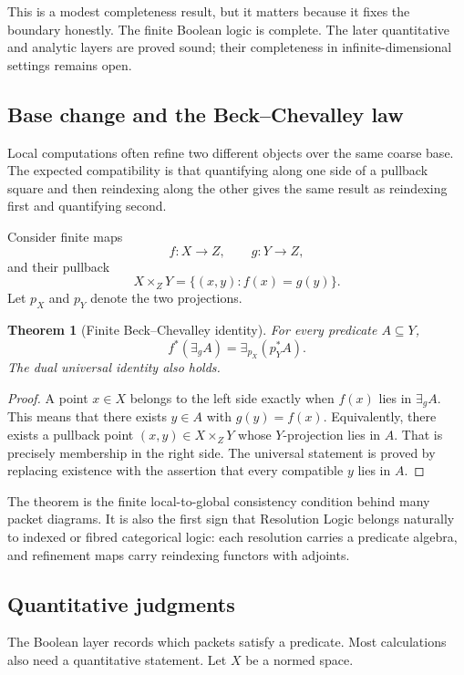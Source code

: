 \documentclass[11pt]{article}
\newtheorem{theorem}{Theorem}[section]
\theoremstyle{definition}
\theoremstyle{remark}
\begin{document}
This is a modest completeness result, but it matters because it fixes the boundary honestly.  The finite Boolean logic is complete.  The later quantitative and analytic layers are proved sound; their completeness in infinite-dimensional settings remains open.

\subsection{Base change and the Beck--Chevalley law}

Local computations often refine two different objects over the same coarse base.  The expected compatibility is that quantifying along one side of a pullback square and then reindexing along the other gives the same result as reindexing first and quantifying second.

Consider finite maps
\[
   f:X\to Z,
   \qquad
   g:Y\to Z,
\]
and their pullback
\[
   X\times_ZY
   =\{(x,y):f(x)=g(y)\}.
\]
Let $p_X$ and $p_Y$ denote the two projections.

\begin{theorem}[Finite Beck--Chevalley identity]
For every predicate $A\subseteq Y$,
\[
   f^*(\exists_g A)
   =
   \exists_{p_X}(p_Y^*A).
\]
The dual universal identity also holds.
\end{theorem}

\begin{proof}
A point $x\in X$ belongs to the left side exactly when $f(x)$ lies in $\exists_gA$.  This means that there exists $y\in A$ with $g(y)=f(x)$.  Equivalently, there exists a pullback point $(x,y)\in X\times_ZY$ whose $Y$-projection lies in $A$.  That is precisely membership in the right side.  The universal statement is proved by replacing existence with the assertion that every compatible $y$ lies in $A$.
\end{proof}

The theorem is the finite local-to-global consistency condition behind many packet diagrams.  It is also the first sign that Resolution Logic belongs naturally to indexed or fibred categorical logic: each resolution carries a predicate algebra, and refinement maps carry reindexing functors with adjoints.

\subsection{Quantitative judgments}

The Boolean layer records which packets satisfy a predicate.  Most calculations also need a quantitative statement.  Let $X$ be a normed space.
\end{document}
